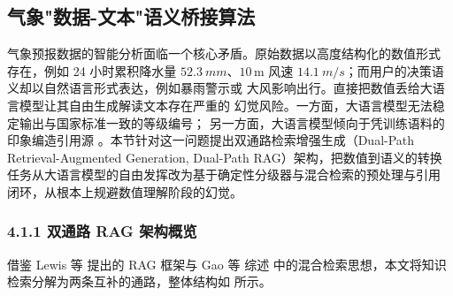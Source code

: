 ﻿%

\subsection{气象"数据-文本"语义桥接算法}
\label{sec:semantic-bridge}

气象预报数据的智能分析面临一个核心矛盾。原始数据以高度结构化的数值形式
存在，例如 24 小时累积降水量 $\SI{52.3}{mm}$、$10\,\mathrm{m}$ 风速
$\SI{14.1}{m/s}$；而用户的决策语义却以自然语言形式表达，例如暴雨警示或
大风影响出行。直接把数值丢给大语言模型让其自由生成解读文本存在严重的
幻觉风险。一方面，大语言模型无法稳定输出与国家标准一致的等级编号；
另一方面，大语言模型倾向于凭训练语料的印象编造引用源
\cite{ref10, ref20}。本节针对这一问题提出双通路检索增强生成（Dual-Path
Retrieval-Augmented Generation, Dual-Path RAG）架构，把数值到语义的转换
任务从大语言模型的自由发挥改为基于确定性分级器与混合检索的预处理与引用
闭环，从根本上规避数值理解阶段的幻觉。

\subsubsection*{4.1.1 \quad 双通路 RAG 架构概览}

借鉴 Lewis 等 \cite{ref12} 提出的 RAG 框架与 Gao 等 \cite{ref24} 综述
中的混合检索思想，本文将知识检索分解为两条互补的通路，整体结构如
 所示。

